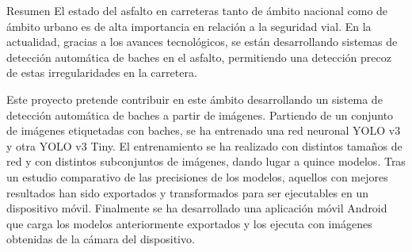 \begin{poliabstract}{Resumen}
\noindent
El estado del asfalto en carreteras tanto de ámbito nacional como de ámbito urbano es de alta importancia en relación a la seguridad vial. En la actualidad, gracias a los avances tecnológicos, se están desarrollando sistemas de detección automática de baches en el asfalto, permitiendo una detección precoz de estas irregularidades en la carretera.

\doublespacing\singlespacing
\noindent
Este proyecto pretende contribuir en este ámbito desarrollando un sistema de detección automática de baches a partir de imágenes. Partiendo de un conjunto de imágenes etiquetadas con baches, se ha entrenado una red neuronal YOLO v3 y otra YOLO v3 Tiny. El entrenamiento se ha realizado con distintos tamaños de red y con distintos subconjuntos de imágenes, dando lugar a quince modelos. Tras un estudio comparativo de las precisiones de los modelos, aquellos con mejores resultados han sido exportados y transformados para ser ejecutables en un dispositivo móvil. Finalmente se ha desarrollado una aplicación móvil Android que carga los modelos anteriormente exportados y los ejecuta con imágenes obtenidas de la cámara del dispositivo.
\end{poliabstract}